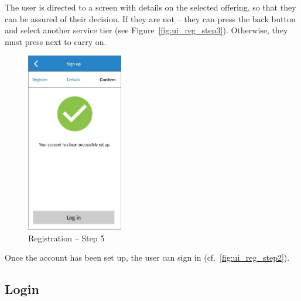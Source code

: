 The user is directed to a screen with details on the selected offering, so that they can be assured of their decision. If they are not -- they can press the back button and select another service tier (see Figure~\ref{fig:ui_reg_step3}). Otherwise, they must press next to carry on.

\begin{figure}
  \centering
  \begin{minipage}{4.6cm}
    \centering
    \includegraphics[width=4.2cm]{inc/ui_reg_step5.jpg}
    \caption{Registration -- Step 5}
    \label{fig:ui_step5}
  \end{minipage}
\end{figure}

\begin{minipage}{14cm}
  \centering
  \begin{minipage}{4.4cm}
    Once the account has been set up, the user can sign in (cf.~\ref{fig:ui_reg_step2}).
  \end{minipage}
\end{minipage}

\subsection{Login}

